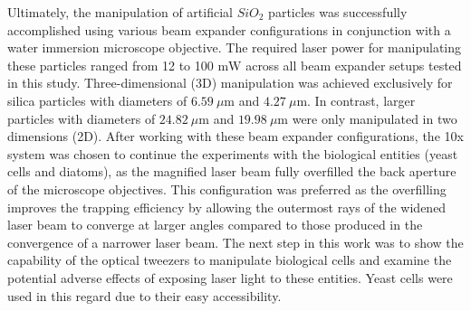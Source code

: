 \documentclass[letterpaper,12pt,oneside]{book}
\begin{document}
Ultimately, the manipulation of artificial $SiO_2$ particles was successfully accomplished using various beam expander configurations in conjunction with a water immersion microscope objective. The required laser power for manipulating these particles ranged from 12 to 100 $\mathrm{mW}$ across all beam expander setups tested in this study. Three-dimensional (3D) manipulation was achieved exclusively for silica particles with diameters of $6.59~\mu\mathrm{m}$ and $4.27~\mu\mathrm{m}$. In contrast, larger particles with diameters of $24.82~\mu\mathrm{m}$ and $19.98~\mu\mathrm{m}$ were only manipulated in two dimensions (2D).
\noindent After working with these beam expander configurations, the 10x system was chosen to continue the experiments with the biological entities (yeast cells and diatoms), as the magnified laser beam fully overfilled the back aperture of the microscope objectives. This configuration was preferred as the overfilling improves the trapping efficiency by allowing the outermost rays of the widened laser beam to converge at larger angles compared to those produced in the convergence of a narrower laser beam. The next step in this work was to show the capability of the optical tweezers to manipulate biological cells and examine the potential adverse effects of exposing laser light to these entities. Yeast cells were used in this regard due to their easy accessibility.
\end{document}
